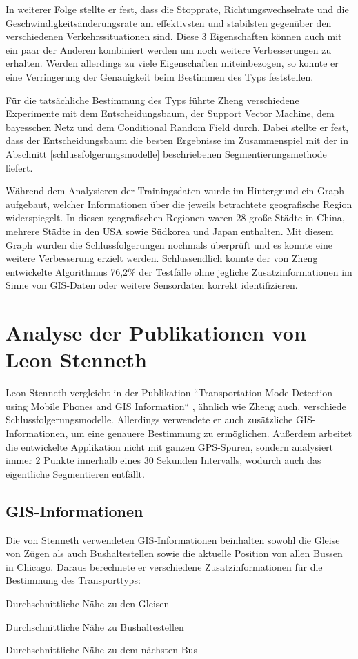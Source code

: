 In weiterer Folge stellte er fest, dass die Stopprate, Richtungswechselrate und die Geschwindigkeitsänderungsrate am effektivsten und stabilsten gegenüber den verschiedenen Verkehrssituationen sind. Diese 3 Eigenschaften können auch mit ein paar der Anderen kombiniert werden um noch weitere Verbesserungen zu erhalten. Werden allerdings zu viele Eigenschaften miteinbezogen, so konnte er eine Verringerung der Genauigkeit beim Bestimmen des Typs feststellen. 

Für die tatsächliche Bestimmung des Typs führte Zheng verschiedene Experimente mit dem Entscheidungsbaum, der Support Vector Machine, dem bayesschen Netz und dem Conditional Random Field durch. Dabei stellte er fest, dass der Entscheidungsbaum die besten Ergebnisse im Zusammenspiel mit der in Abschnitt \ref{schlussfolgerungsmodelle} beschriebenen Segmentierungsmethode liefert. 

Während dem Analysieren der Trainingsdaten wurde im Hintergrund ein Graph aufgebaut, welcher Informationen über die jeweils betrachtete geografische Region widerspiegelt. In diesen geografischen Regionen waren 28 große Städte in China, mehrere Städte in den USA sowie Südkorea und Japan enthalten. Mit diesem Graph wurden die Schlussfolgerungen nochmals überprüft und es konnte eine weitere Verbesserung erzielt werden. Schlussendlich konnte der von Zheng entwickelte Algorithmus 76,2\% der Testfälle ohne jegliche Zusatzinformationen im Sinne von GIS-Daten oder weitere Sensordaten korrekt identifizieren.

\section{Analyse der Publikationen von Leon Stenneth}
Leon Stenneth vergleicht in der Publikation ``Transportation Mode Detection using Mobile Phones and GIS Information`` \cite{stenneth_transportation_2011}, ähnlich wie Zheng auch, verschiede Schlussfolgerungsmodelle. Allerdings verwendete er auch zusätzliche GIS-Informationen, um eine genauere Bestimmung zu ermöglichen. Außerdem arbeitet die entwickelte Applikation nicht mit ganzen GPS-Spuren, sondern analysiert immer 2 Punkte innerhalb eines 30 Sekunden Intervalls, wodurch auch das eigentliche Segmentieren entfällt.

\subsection{GIS-Informationen}
Die von Stenneth verwendeten GIS-Informationen beinhalten sowohl die Gleise von Zügen als auch Bushaltestellen sowie die aktuelle Position von allen Bussen in Chicago. Daraus berechnete er verschiedene Zusatzinformationen für die Bestimmung des Transporttyps:
\begin{pitemize}
\item Durchschnittliche Nähe zu den Gleisen
\item Durchschnittliche Nähe zu Bushaltestellen
\item Durchschnittliche Nähe zu dem nächsten Bus
\end{pitemize}

